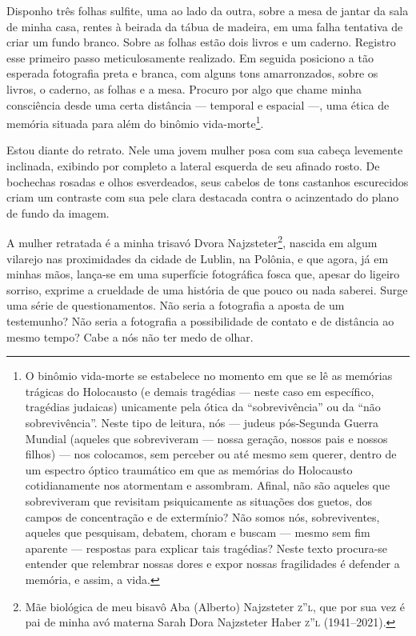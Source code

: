 \begin{center}\end{center}

\noindent{}Disponho três folhas sulfite, uma ao lado da outra, sobre a mesa de
jantar da sala de minha casa, rentes à beirada da tábua de madeira, em
uma falha tentativa de criar um fundo branco. Sobre as folhas estão dois
livros e um caderno. Registro esse primeiro passo meticulosamente
realizado. Em seguida posiciono a tão esperada fotografia preta e
branca, com alguns tons amarronzados, sobre os livros, o caderno, as
folhas e a mesa. Procuro por algo que chame minha consciência desde uma
certa distância --- temporal e espacial ---, uma ética de memória
situada para além do binômio vida-morte\footnote{O binômio vida-morte se
  estabelece no momento em que se lê as memórias trágicas do Holocausto
  (e demais tragédias --- neste caso em específico, tragédias judaicas)
  unicamente pela ótica da ``sobrevivência'' ou da ``não
  sobrevivência''. Neste tipo de leitura, nós --- judeus pós-Segunda
  Guerra Mundial (aqueles que sobreviveram --- nossa geração, nossos
  pais e nossos filhos) --- nos colocamos, sem perceber ou até mesmo sem
  querer, dentro de um espectro óptico traumático em que as memórias do
  Holocausto cotidianamente nos atormentam e assombram. Afinal, não são
  aqueles que sobreviveram que revisitam psiquicamente as situações dos
  guetos, dos campos de concentração e de extermínio? Não somos nós,
  sobreviventes, aqueles que pesquisam, debatem, choram e buscam ---
  mesmo sem fim aparente --- respostas para explicar tais tragédias?
  Neste texto procura-se entender que relembrar nossas dores e expor
  nossas fragilidades é defender a memória, e assim, a vida.}.

Estou diante do retrato. Nele uma jovem mulher posa com sua cabeça
levemente inclinada, exibindo por completo a lateral esquerda de seu
afinado rosto. De bochechas rosadas e olhos esverdeados, seus cabelos de
tons castanhos escurecidos criam um contraste com sua pele clara
destacada contra o acinzentado do plano de fundo da imagem.

A mulher retratada é a minha trisavó Dvora Najzsteter\footnote{Mãe
  biológica de meu bisavô Aba (Alberto) Najzsteter \textsc{z''l}, que por
  sua vez é pai de minha avó materna Sarah Dora Najzsteter Haber
  \textsc{z''l} (1941--2021).}, nascida em algum vilarejo nas proximidades
da cidade de Lublin, na Polônia, e que agora, já em minhas mãos,
lança-se em uma superfície fotográfica fosca que, apesar do ligeiro
sorriso, exprime a crueldade de uma história de que pouco ou nada
saberei. Surge uma série de questionamentos. Não seria a fotografia a
aposta de um testemunho? Não seria a fotografia a possibilidade de
contato e de distância ao mesmo tempo? Cabe a nós não ter medo de olhar.

